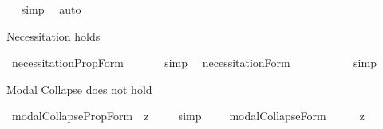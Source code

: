 \begin{isabellebody}
\isadelimproof
\ %
\endisadelimproof
%
\isatagproof
{}\isamarkupfalse%
\ simp\ \isamarkupfalse%
\ auto%
\endisatagproof
{\isafoldproof}%
%
\isadelimproof
%
\endisadelimproof
%
\isamarkuptrue%
%
\begin{isamarkuptext}%
Necessitation holds%
\end{isamarkuptext}%
\isamarkuptrue%
\isamarkupfalse%
\ necessitation{\isacharunderscore}PropForm{\isacharcolon}\ {\isachardoublequoteopen}{\isacharbrackleft}{\isacharcomma}{\isasymphi}{\isacharcomma}{\isacharbrackright}\ {\isasymlongrightarrow}\ {\isacharbrackleft}{\isasymbox}\ {\isacharcomma}{\isasymphi}{\isacharcomma}{\isacharbrackright}{\isachardoublequoteclose}%
\isadelimproof
\ %
\endisadelimproof
%
\isatagproof
{}\isamarkupfalse%
\ simp\ \isamarkupfalse%
%
\endisatagproof
{\isafoldproof}%
%
\isadelimproof
%
\endisadelimproof
\isanewline
{}\isamarkupfalse%
\ necessitation{\isacharunderscore}Form{\isacharcolon}\ \ \ \ \ {\isachardoublequoteopen}{\isacharbrackleft}{\isacharsemicolon}{\isasymphi}{\isacharsemicolon}{\isacharbrackright}\ {\isasymlongrightarrow}\ {\isacharbrackleft}{\isasymbox}\ {\isacharsemicolon}{\isasymphi}{\isacharsemicolon}{\isacharbrackright}{\isachardoublequoteclose}%
\isadelimproof
\ %
\endisadelimproof
%
\isatagproof
{}\isamarkupfalse%
\ simp\ \isamarkupfalse%
%
\endisatagproof
{\isafoldproof}%
%
\isadelimproof
%
\endisadelimproof
%
\begin{isamarkuptext}%
Modal Collapse does not hold%
\end{isamarkuptext}%
\isamarkuptrue%
\isamarkupfalse%
\ modalCollapse{\isacharunderscore}PropForm{\isacharcolon}\ {\isachardoublequoteopen}{\isacharbrackleft}{\isacharcomma}{\isasymphi}{\isacharcomma}\ {\isasymrightarrow}\isactrlsup z\ {\isasymbox}\ {\isacharcomma}{\isasymphi}{\isacharcomma}{\isacharbrackright}{\isachardoublequoteclose}%
\isadelimproof
\ %
\endisadelimproof
%
\isatagproof
{}\isamarkupfalse%
\ simp%
\endisatagproof
{\isafoldproof}%
%
\isadelimproof
%
\endisadelimproof
\ \isamarkupfalse%
%
\isadelimproof
\ %
\endisadelimproof
%
\isatagproof
{}\isamarkupfalse%
%
\endisatagproof
{\isafoldproof}%
%
\isadelimproof
%
\endisadelimproof
\isanewline
{}\isamarkupfalse%
\ modalCollapse{\isacharunderscore}Form{\isacharcolon}\ \ \ \ \ {\isachardoublequoteopen}{\isacharbrackleft}{\isacharsemicolon}{\isasymphi}{\isacharsemicolon}\ {\isasymrightarrow}\isactrlsup z\ {\isasymbox}\ {\isacharsemicolon}{\isasymphi}{\isacharsemicolon}{\isacharbrackright}{\isachardoublequoteclose}%

\end{isabellebody}
